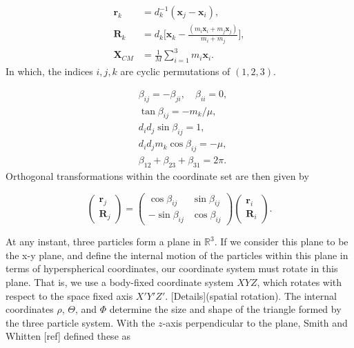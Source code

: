 \documentclass{article}
\numberwithin{equation}{section}
\numberwithin{figure}{section}
\begin{document}
\begin{align}
\mathbf{r}_k &= d^{-1}_k(\mathbf{x}_{j}-\mathbf{x}_{i}), \\
\mathbf{R}_k &= d_k\Big[\mathbf{x}_{k}-\frac{(m_{i}\mathbf{x}_{i}+m_{j}\mathbf{x}_{j})}{m_{i}+m_{j}}\Big],\\
\mathbf{X}_{CM} &= \frac{1}{M} \sum_{i=1}^{3} m_{i} \mathbf{x}_{i}.
\end{align}   
In which, the indices $i,j,k$ are cyclic permutations of $(1,2,3)$. 

\begin{subequations}
	\begin{align}
	&\beta_{ij} = -\beta_{ji}, \quad \beta_{ii} = 0,\\
	&\tan\beta_{ij} = -m_k/\mu,\\
	&d_{i}d_{j} \sin\beta_{ij} = 1,\\
	&d_{i}d_{j} m_{k} \cos\beta_{ij} = -\mu,\\
	&\beta_{12}+\beta_{23}+\beta_{31} = 2\pi.
	\end{align}
\end{subequations}
Orthogonal transformations within the coordinate set are then given by 

\begin{equation}
\begin{pmatrix}
\mathbf{r}_j\\
\mathbf{R}_j
\end{pmatrix}
=
\begin{pmatrix}
\cos\beta_{ij} & \sin\beta_{ij}\\
-\sin\beta_{ij} & \cos\beta_{ij}
\end{pmatrix}
\begin{pmatrix}
\mathbf{r}_i\\
\mathbf{R}_i
\end{pmatrix}.
\end{equation}   

At any instant, three particles form a plane in $\mathbb{R}^3$. If we consider this plane to be the x-y plane, and define the internal motion of the particles within this plane in terms of  hyperspherical coordinates, our coordinate system must rotate in this plane. That is, we use a body-fixed coordinate system $XYZ$, which rotates with respect to the space fixed axis $X'Y'Z'$. [Details](spatial rotation). The internal coordinates $\rho$, $\Theta$, and $\Phi$ determine the size and shape of the triangle formed by the three particle system. With the $z$-axis perpendicular to the plane, Smith and Whitten [ref] defined these as   
\end{document}
